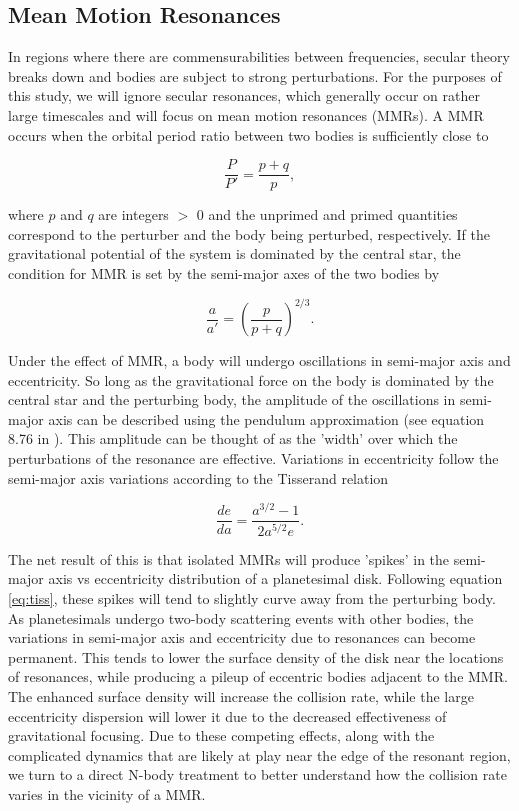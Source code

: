 \documentclass[twocolumn]{aastex63}
\begin{document}
\subsection{Mean Motion Resonances}

In regions where there are commensurabilities between frequencies, secular theory breaks down and bodies are subject to strong 
perturbations. For the purposes of this study, we will ignore secular resonances, which generally occur on rather large timescales 
and will focus on mean motion resonances (MMRs). A MMR occurs  when the orbital period ratio between two bodies is sufficiently 
close to

\begin{equation}\label{eq:per_mmr}
	\frac{P}{P'} = \frac{p + q}{p},
\end{equation}

\noindent where  $p$ and $q$ are integers $>$ 0 and the unprimed and primed quantities correspond to the perturber and the body 
being perturbed, respectively. If the gravitational potential of the system is dominated by the central star, the condition for MMR is set 
by the semi-major axes of the two bodies by

\begin{equation}\label{eq:a_mmr}
	\frac{a}{a'} = \left( \frac{p}{p + q} \right)^{2/3}.
\end{equation}

Under the effect of MMR, a body will undergo oscillations in semi-major axis and eccentricity. So long as the gravitational force on 
the body is dominated by the central star and the perturbing body, the amplitude of the oscillations in semi-major axis can be 
described using the pendulum approximation (see equation 8.76 in \citet{2000ssd..book.....M}). This amplitude can be thought of 
as the 'width' over which the perturbations of the resonance are effective. Variations in eccentricity follow the semi-major axis 
variations according to the Tisserand relation

\begin{equation}\label{eq:tiss}
	\frac{de}{da} = \frac{a^{3/2} - 1}{2 a^{5/2} e}.
\end{equation}

The net result of this is that isolated MMRs will produce 'spikes' in the semi-major axis vs eccentricity distribution of a planetesimal 
disk. Following equation \ref{eq:tiss}, these spikes will tend to slightly curve away from the perturbing body. As planetesimals 
undergo two-body scattering events with other bodies, the variations in semi-major axis and eccentricity due to resonances can 
become permanent. This tends to lower the surface density of the disk near the locations of resonances, while producing a pileup of 
eccentric bodies adjacent to the MMR. The enhanced surface density will increase the collision rate, while the large eccentricity 
dispersion will lower it due to the decreased effectiveness of gravitational focusing. Due to these competing effects, along with the 
complicated dynamics that are likely at play near the edge of the resonant region, we turn to a direct N-body treatment to better 
understand how the collision rate varies in the vicinity of a MMR.
\end{document}
